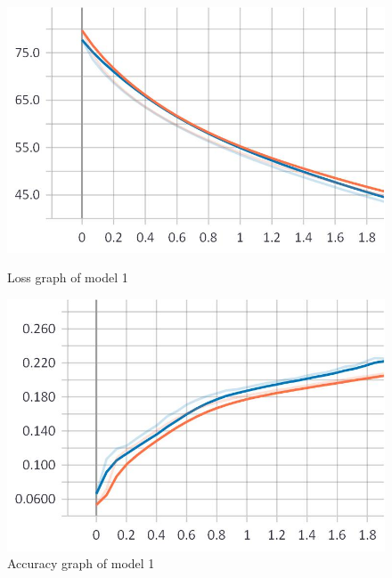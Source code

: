 \begin{figure}
\centering
\begin{minipage}{.5\textwidth}
	\centering
	\includegraphics[width=1\linewidth]{Illustrations/losss2.jpg}
	\caption{Loss graph of model 1}
	\label{fig:loss2}
\end{minipage}%
\begin{minipage}{.5\textwidth}
	\centering
	\includegraphics[width=1\linewidth]{Illustrations/accuracy2.jpg}
	\caption{Accuracy graph of model 1}
	\label{fig:accuracy2}
\end{minipage}
\end{figure}

